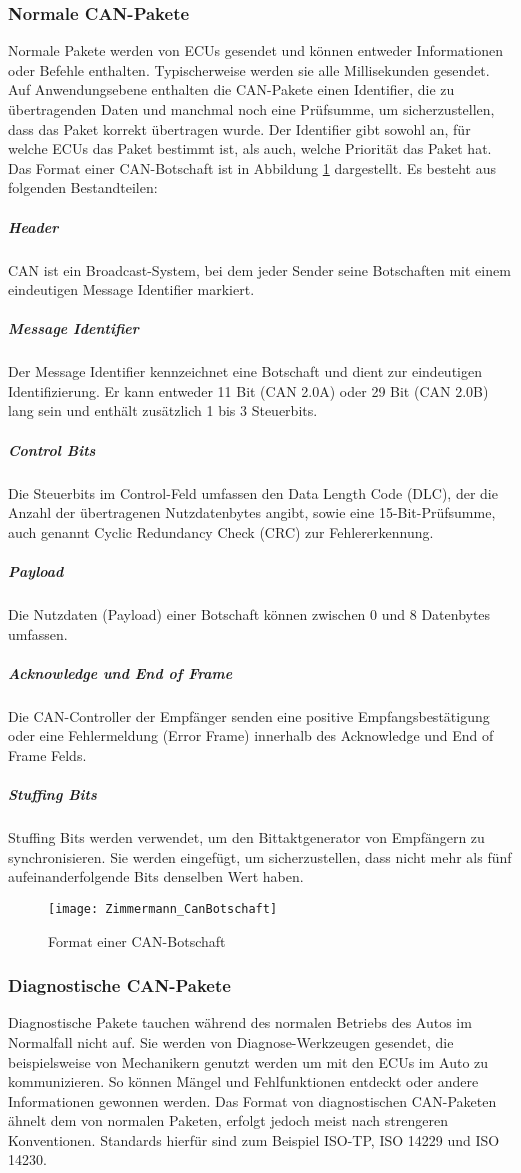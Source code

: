 \subsubsection{Normale \acs{CAN}-Pakete}
Normale Pakete werden von \acsp{ECU} gesendet und können entweder Informationen oder Befehle enthalten. Typischerweise werden sie alle Millisekunden gesendet. Auf Anwendungsebene enthalten die \acs{CAN}-Pakete einen Identifier, die zu übertragenden Daten und manchmal noch eine Prüfsumme, um sicherzustellen, dass das Paket korrekt übertragen wurde. Der Identifier gibt sowohl an, für welche \acsp{ECU} das Paket bestimmt ist, als auch, welche Priorität das Paket hat. \cite[vgl.][9]{Miller.2013}\\
Das Format einer \acs{CAN}-Botschaft ist in Abbildung \ref{fig:CanBotschaft} dargestellt. Es besteht aus folgenden Bestandteilen:
\subparagraph{Header} CAN ist ein Broadcast-System, bei dem jeder Sender seine Botschaften mit einem eindeutigen Message Identifier markiert.
\subparagraph{Message Identifier} Der Message Identifier kennzeichnet eine Botschaft und dient zur eindeutigen Identifizierung. Er kann entweder 11 Bit (CAN 2.0A) oder 29 Bit (CAN 2.0B) lang sein und enthält zusätzlich 1 bis 3 Steuerbits.
\subparagraph{Control Bits} Die Steuerbits im Control-Feld umfassen den Data Length Code (DLC), der die Anzahl der übertragenen Nutzdatenbytes angibt, sowie eine 15-Bit-Prüfsumme, auch genannt Cyclic Redundancy Check (CRC) zur Fehlererkennung.
\subparagraph{Payload} Die Nutzdaten (Payload) einer Botschaft können zwischen 0 und 8 Datenbytes umfassen.
\subparagraph{Acknowledge und End of Frame} Die CAN-Controller der Empfänger senden eine positive Empfangsbestätigung oder eine Fehlermeldung (Error Frame) innerhalb des Acknowledge und End of Frame Felds.
\subparagraph{Stuffing Bits} Stuffing Bits werden verwendet, um den Bittaktgenerator von Empfängern zu synchronisieren. Sie werden eingefügt, um sicherzustellen, dass nicht mehr als fünf aufeinanderfolgende Bits denselben Wert haben. \cite[61\psqq]{Zimmermann.2014}

\begin{figure}[h]
\centering
\texttt{[image: Zimmermann\_CanBotschaft]}
\label{fig:CanBotschaft}
\caption{Format einer \acs{CAN}-Botschaft}
\end{figure}


\subsubsection{Diagnostische \acs{CAN}-Pakete}
Diagnostische Pakete tauchen während des normalen Betriebs des Autos im Normalfall nicht auf. Sie werden von Diagnose-Werkzeugen gesendet, die beispielsweise von Mechanikern genutzt werden um mit den \acsp{ECU} im Auto zu kommunizieren. So können Mängel und Fehlfunktionen entdeckt oder andere Informationen gewonnen werden. Das Format von diagnostischen \acs{CAN}-Paketen ähnelt dem von normalen Paketen, erfolgt jedoch meist nach strengeren Konventionen. Standards hierfür sind zum Beispiel ISO-TP, ISO 14229 und ISO 14230. \cite[vgl.][10]{Miller.2013}


